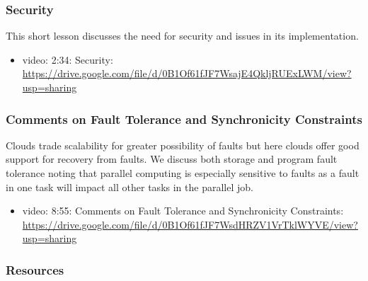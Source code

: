 \subsubsection{Security}\label{security}

This short lesson discusses the need for security and issues in its
implementation.

\begin{itemize}
\item
  video: 2:34: Security:
  \url{https://drive.google.com/file/d/0B1Of61fJF7WsajE4QkljRUExLWM/view?usp=sharing}
\end{itemize}

\subsubsection{Comments on Fault Tolerance and Synchronicity Constraints}\label{comments-on-fault-tolerance-and-synchronicity-constraints}

Clouds trade scalability for greater possibility of faults but here
clouds offer good support for recovery from faults. We discuss both
storage and program fault tolerance noting that parallel computing is
especially sensitive to faults as a fault in one task will impact all
other tasks in the parallel job.

\begin{itemize}
\item
  video: 8:55: Comments on Fault Tolerance and Synchronicity
  Constraints:
  \url{https://drive.google.com/file/d/0B1Of61fJF7WsdHRZV1VrTklWYVE/view?usp=sharing}
\end{itemize}

\subsubsection{Resources}\label{resources-3}

